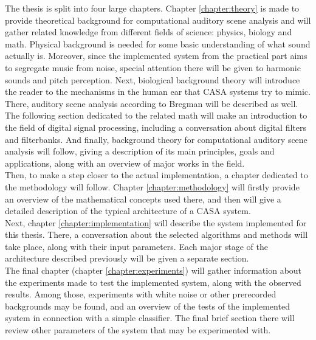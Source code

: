 The thesis is split into four large chapters. Chapter \ref{chapter:theory} is made to provide theoretical background for computational auditory scene analysis and will gather related knowledge from different fields of science: physics, biology and math. Physical background is needed for some basic understanding of what sound actually is. Moreover, since the implemented system from the practical part aims to segregate music from noise, special attention there will be given to harmonic sounds and pitch perception. Next, biological background theory will introduce the reader to the mechanisms in the human ear that CASA systems try to mimic. There, auditory scene analysis according to Bregman will be described as well. The following section dedicated to the related math will make an introduction to the field of digital signal processing, including a conversation about digital filters and filterbanks. And finally, background theory for computational auditory scene analysis will follow, giving a description of its main principles, goals and applications, along with an overview of major works in the field.\\

Then, to make a step closer to the actual implementation, a chapter dedicated to the metho\-dology will follow. Chapter \ref{chapter:methodology} will firstly provide an overview of the mathematical concepts used there, and then will give a detailed description of the typical architecture of a CASA system.\\

Next, chapter \ref{chapter:implementation} will describe the system implemented for this thesis. There, a conversation about the selected algorithms and methods will take place, along with their input parameters. Each major stage of the architecture described previously will be given a separate section.\\

The final chapter (chapter \ref{chapter:experiments}) will gather information about the experiments made to test the implemented system, along with the observed results. Among those, experiments with white noise or other prerecorded backgrounds may be found, and an overview of the tests of the implemented system in connection with a simple classifier. The final brief section there will review other parameters of the system that may be experimented with.\\
